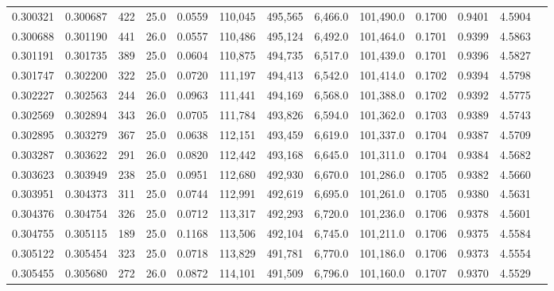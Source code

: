 \begin{tabular}{rrrrrrrrrrrrr}
0.300321 & 0.300687 &   422 & 25.0 &                                     0.0559 & 110,045 & 495,565 &   6,466.0 & 101,490.0 & 0.1700 & 0.9401 & 4.5904 \\
0.300688 & 0.301190 &   441 & 26.0 &                                     0.0557 & 110,486 & 495,124 &   6,492.0 & 101,464.0 & 0.1701 & 0.9399 & 4.5863 \\
0.301191 & 0.301735 &   389 & 25.0 &                                     0.0604 & 110,875 & 494,735 &   6,517.0 & 101,439.0 & 0.1701 & 0.9396 & 4.5827 \\
0.301747 & 0.302200 &   322 & 25.0 &                                     0.0720 & 111,197 & 494,413 &   6,542.0 & 101,414.0 & 0.1702 & 0.9394 & 4.5798 \\
0.302227 & 0.302563 &   244 & 26.0 &                                     0.0963 & 111,441 & 494,169 &   6,568.0 & 101,388.0 & 0.1702 & 0.9392 & 4.5775 \\
0.302569 & 0.302894 &   343 & 26.0 &                                     0.0705 & 111,784 & 493,826 &   6,594.0 & 101,362.0 & 0.1703 & 0.9389 & 4.5743 \\
0.302895 & 0.303279 &   367 & 25.0 &                                     0.0638 & 112,151 & 493,459 &   6,619.0 & 101,337.0 & 0.1704 & 0.9387 & 4.5709 \\
0.303287 & 0.303622 &   291 & 26.0 &                                     0.0820 & 112,442 & 493,168 &   6,645.0 & 101,311.0 & 0.1704 & 0.9384 & 4.5682 \\
0.303623 & 0.303949 &   238 & 25.0 &                                     0.0951 & 112,680 & 492,930 &   6,670.0 & 101,286.0 & 0.1705 & 0.9382 & 4.5660 \\
0.303951 & 0.304373 &   311 & 25.0 &                                     0.0744 & 112,991 & 492,619 &   6,695.0 & 101,261.0 & 0.1705 & 0.9380 & 4.5631 \\
0.304376 & 0.304754 &   326 & 25.0 &                                     0.0712 & 113,317 & 492,293 &   6,720.0 & 101,236.0 & 0.1706 & 0.9378 & 4.5601 \\
0.304755 & 0.305115 &   189 & 25.0 &                                     0.1168 & 113,506 & 492,104 &   6,745.0 & 101,211.0 & 0.1706 & 0.9375 & 4.5584 \\
0.305122 & 0.305454 &   323 & 25.0 &                                     0.0718 & 113,829 & 491,781 &   6,770.0 & 101,186.0 & 0.1706 & 0.9373 & 4.5554 \\
0.305455 & 0.305680 &   272 & 26.0 &                                     0.0872 & 114,101 & 491,509 &   6,796.0 & 101,160.0 & 0.1707 & 0.9370 & 4.5529 \\

\end{tabular}
